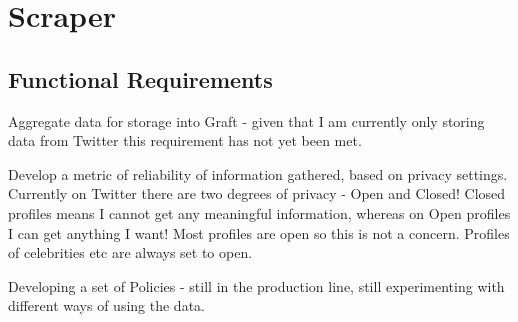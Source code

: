 \section{Scraper}

\subsection{Functional Requirements}

Aggregate data for storage into Graft - given that I am currently only storing data from Twitter this requirement has not yet been met.

Develop a metric of reliability of information gathered, based on privacy settings. Currently on Twitter there are two degrees of privacy - Open and Closed! Closed profiles means I cannot get any meaningful information, whereas on Open profiles I can get anything I want! Most profiles are open so this is not a concern. Profiles of celebrities etc are always set to open.

Developing a set of Policies - still in the production line, still experimenting with different ways of using the data.